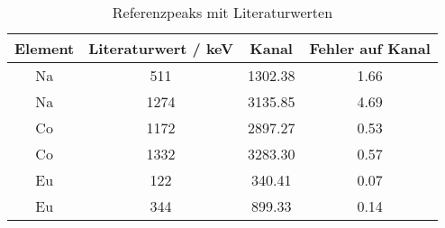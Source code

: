 \begin{table}[H]
\caption{Referenzpeaks mit Literaturwerten}
\begin{center}
\begin{tabular}{|c|c|c|c|}
  \hline
  Element & Literaturwert / keV & Kanal & Fehler auf Kanal \\ \hline
  Na & 511 & 1302.38 & 1.66 \\ \hline
  Na & 1274 & 3135.85 & 4.69 \\ \hline
  Co & 1172 & 2897.27 & 0.53 \\ \hline
  Co & 1332 & 3283.30 & 0.57 \\ \hline
  Eu & 122 & 340.41 & 0.07 \\ \hline
  Eu & 344 & 899.33 & 0.14 \\ \hline
\end{tabular}
\end{center}
\label{tab:energygauge}
\end{table}
